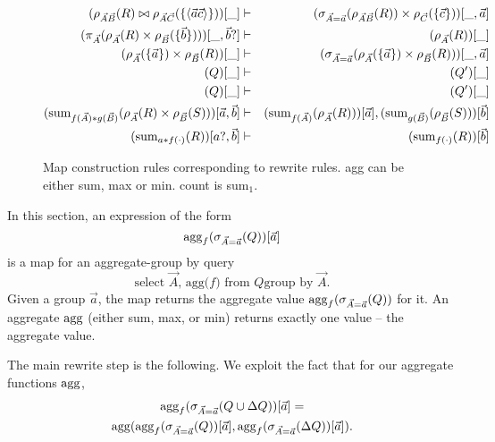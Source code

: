 \begin{figure*}
\begin{center}
\begin{eqnarray}
(\rho_{\vec{A}\vec{B}}(R) \bowtie
\rho_{\vec{A}\vec{C}}(\{{\langle\vec{a}\vec{c}\rangle} \}))[\_]
& \vdash &
(\sigma_{\vec{A}=\vec{a}}(\rho_{\vec{A}\vec{B}}(R))
\times \rho_{\vec{C}}(\{ \vec{c} \}))[\_,\vec{a}]
\label{mr1}
\\
(\pi_{\vec{A}}(\rho_{\vec{A}}(R) \times
\rho_{\vec{B}}(\{ \vec{b}\})))[\_,\vec{b}?]
& \vdash &
(\rho_{\vec{A}}(R))[\_]
\label{mr2}
\\
(\rho_{\vec{A}}(\{\vec{a}\}) \times \rho_{\vec{B}}(R))[\_]
& \vdash &
(\sigma_{\vec{A}=\vec{a}}(\rho_{\vec{A}}(\{\vec{a}\})
\times \rho_{\vec{B}}(R)))[\_,\vec{a}]
\label{mr3}
\\
(Q)[\_] & \vdash & (Q')[\_] \\
(Q)[\_] & \vdash & (Q')[\_] \\
(\mathrm{sum}_{f(\vec{A}) * g(\vec{B})}
(\rho_{\vec{A}}(R) \times
\rho_{\vec{B}}(S)))[\vec{a},\vec{b}]
& \vdash &
(\mathrm{sum}_{f(\vec{A})}(\rho_{\vec{A}}(R)))[\vec{a}], 
(\mathrm{sum}_{g(\vec{B})}(\rho_{\vec{B}}(S)))[\vec{b}]
\label{mr6}
\\
(\mathrm{sum}_{a * f(\cdot)}(R))[a?,\vec{b}]
& \vdash &
(\mathrm{sum}_{f(\cdot)}(R))[\vec{b}]
\label{mr7}
\\
\end{eqnarray}
\end{center}
\caption{Map construction rules corresponding to rewrite rules. agg can be
either sum, max or min. count is sum$_1$.}
\label{fig:maprules}
\end{figure*}

In this section, an expression of the form
\[
\mathrm{agg}_f(\sigma_{\vec{A}=\vec{a}}(Q))[\vec{a}]
\]
is a map for an aggregate-group by query
\[
\mbox{select $\vec{A}$, agg($f$)
from $Q$
group by $\vec{A}$}.
\]
Given a group $\vec{a}$, the map returns
the aggregate value
$\mathrm{agg}_f(\sigma_{\vec{A}=\vec{a}}(Q))$ for it.
An aggregate $\mathrm{agg}$ (either sum, max, or min) returns exactly
one value -- the aggregate value.

The main rewrite step is the following.
We exploit the fact that for our aggregate functions $\mathrm{agg}$,
\begin{multline*}
\mathrm{agg}_f(\sigma_{\vec{A}=\vec{a}}(Q \cup \Delta Q))[\vec{a}]
= \\
\mathrm{agg}(\mathrm{agg}_f(\sigma_{\vec{A}=\vec{a}}(Q))[\vec{a}],
\mathrm{agg}_f(\sigma_{\vec{A}=\vec{a}}(\Delta Q))[\vec{a}]).
\end{multline*}


